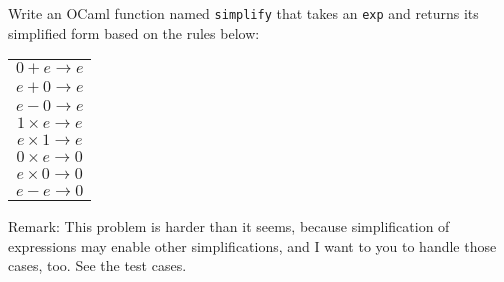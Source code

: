\documentclass[addpoints]{exam}
\begin{document}
\begin{questions}


  \question
  Write an OCaml function named \texttt{simplify}
  that takes an \texttt{exp} and returns its simplified form
  based on the rules below:

  {
    \begin{center}
    \begin{tabular}{c}\hline
      $0+e \to e$\\
      $e+0 \to e$\\
      $e-0 \to e$\\
      $1\times e \to e$\\
      $e\times 1 \to e$\\
      $0\times e \to 0$\\
      $e\times 0 \to 0$\\
      $e-e \to 0$\\\hline
    \end{tabular}
    \end{center}
  }

  Remark: This problem is harder than it seems, because
  simplification of expressions may enable other simplifications,
  and I want to you to handle those cases, too.   
  See the test cases.


\end{questions}
\end{document}
